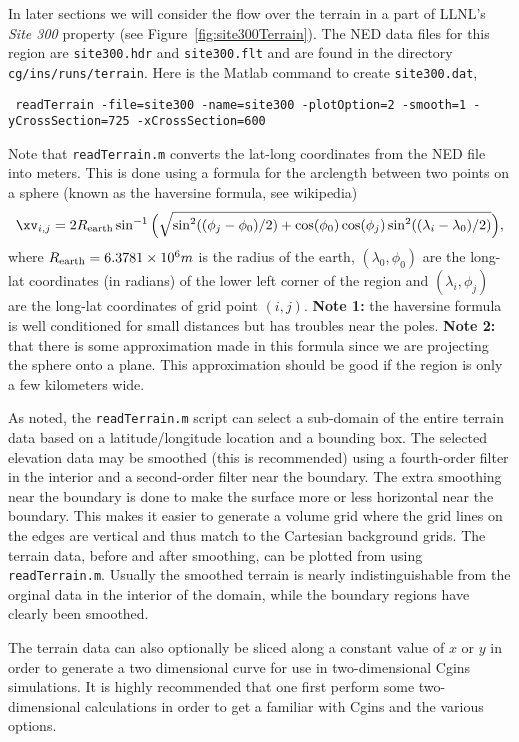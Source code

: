 \documentclass[11pt]{article}
\begin{document}
In later sections we will consider the flow over the terrain in a part of LLNL's {\em Site 300} property (see Figure~\ref{fig:site300Terrain}).
The NED data files for this region are {\tt site300.hdr} and {\tt site300.flt} and are found 
in the directory {\tt cg/ins/runs/terrain}. Here is the Matlab command to create {\tt site300.dat}, 
\begin{flushleft}\tt
  readTerrain -file=site300 -name=site300 -plotOption=2 -smooth=1 -yCrossSection=725 -xCrossSection=600
\end{flushleft}

Note that {\tt readTerrain.m} converts the lat-long coordinates from the NED file into meters. This is done
using a formula for the arclength between two points on a sphere  (known as the haversine formula, see wikipedia)
\begin{align*}
   \xv_{i,j} = 2 R_{\rm earth} \sin^{-1}\Big( \sqrt{ \sin^2(( \phi_j - \phi_0 )/2) + \cos(\phi_0)\cos(\phi_j) \sin^2((\lambda_i-\lambda_0)/2) } \Big),
\end{align*}
where $R_{\rm earth}=6.3781\times 10^6 m$ is the radius of the earth, $(\lambda_0,\phi_0)$ are the long-lat coordinates (in radians) of the
lower left corner of the region and $(\lambda_i,\phi_j)$ are the long-lat coordinates of grid point $(i,j)$.
{\bf Note 1:} the haversine formula is well conditioned for small distances but has troubles near the poles.
{\bf Note 2:} that there is some approximation made in this formula since we are projecting the sphere onto a plane. This
approximation should be good if the region is only a few kilometers wide.

As noted, the {\tt readTerrain.m} script can select a sub-domain of the entire terrain data based on a latitude/longitude
location and a bounding box. 
The selected elevation data may be smoothed (this is recommended)
using a fourth-order filter in the interior and a second-order filter near the boundary. The extra smoothing near
the boundary is done to make the surface more or less horizontal near the boundary. 
This makes it easier to generate a volume grid where the grid lines on the edges are vertical and thus match
to the Cartesian background grids. 
The terrain data, before and after smoothing, can
be plotted from using {\tt readTerrain.m}. Usually the smoothed terrain is nearly indistinguishable from the
orginal data in the interior of the domain, while the boundary regions have clearly been smoothed. 

The terrain data can also optionally be sliced along a constant value of $x$ or $y$ in order to generate
a two dimensional curve for use in two-dimensional Cgins simulations. It is highly recommended that one first
perform some two-dimensional calculations in order to get a familiar with Cgins and the various options.
\end{document}
